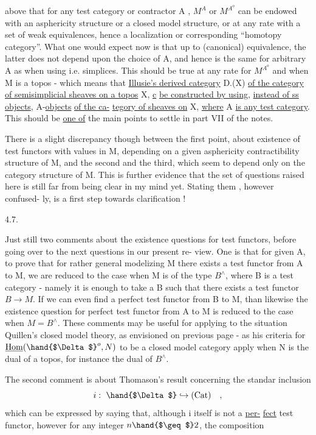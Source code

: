 above that for any test category or contractor A , $M^A$ or $M^{A^o}$ can
be endowed with an asphericity structure or a closed model structure,
or at any rate with a set of weak equivalences, hence a localization
or corresponding ``homotopy category''. What one would expect now is
that up to (canonical) equivalence, the latter does not depend upon
the choice of A, and hence is the same for arbitrary A as when using
\hand{$\Delta$} i.e. simplices. This should be true at any rate for $M^{A^o}$ 
and when M is a topos - which means that \uline{Illusie's derived category}
D.(X) \uline{of the category of semisimplicial sheaves on a topos} X, \uline{c}
\uline{be constructed by using}, \uline{instead of ss objects}, A-\uline{objects} \uline{of the ca-}%
\uline{tegory of sheaves on} X, \uline{where} A \uline{is any test category}. This should be
\margin{$\llcorner$}\uline{one of} the main points to settle in part VII of the notes.

There is a slight discrepancy though between the first point,
about existence of test functors with values in M, depending on a given
asphericity  contractibility structure of M, and the second and the
third, which seem to depend only on the category structure of M. This
is further evidence that the set of questions raised here is still far
from being clear in my mind yet. Stating them , however confused-%
ly, is a first step towards clarification !

4.7.

Just still two comments about the existence questions for test
functors, before going over to the next questions in our present re-%
view. One is that for given A, to prove that for rather general
modelizing M there exists a test functor from A to M, we are reduced to
the case when M is of the type $B^{\wedge}$, where B is a test category - namely
it is enough to take a B such that there exists a test functor $B \longrightarrow M$.
If we can even find a perfect test functor from  B to M, than likewise
the existence question for perfect test functor from A to M is reduced
to the case when $M = B^{\wedge}$. These comments may be useful for applying to
the situation Quillen's closed model theory, as envisioned on previous
page - as his criteria for $\underline{\mathrm{Hom}}(\hand{$\Delta$}^{o}, N)$ to be a closed model category
apply when N is the dual of a topos, for instance the dual of $B^{\wedge}$.

The second comment is about Thomason's result concerning the standar
inclusion
\[ i:\ \hand{$\Delta$} \hookrightarrow (\mathrm{Cat}) \quad , \]
which can be expressed by saying that, although i itself is not a \uline{per-}%
\uline{fect} test functor, however for any integer $n \hand{$\geq$} 2$, the composition
